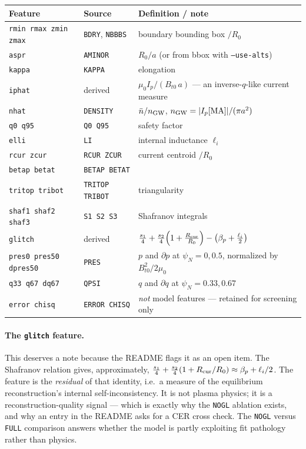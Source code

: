 \documentclass[11pt,a4paper]{article}
\newcommand{\code}[1]{\texttt{\small #1}}
\begin{document}
\begin{longtable}{@{}>{\raggedright\arraybackslash}p{}l>{\raggedright\arraybackslash}p{}@{}}
\toprule
\textbf{Feature} & \textbf{Source} & \textbf{Definition / note} \\
\midrule
\endhead
\code{rmin rmax zmin zmax} & \code{BDRY}, \code{NBBBS} & boundary bounding box $/R_0$ \\
\code{aspr}   & \code{AMINOR}  & $R_0/a$ (or from bbox with \code{--use-alts}) \\
\code{kappa}  & \code{KAPPA}   & elongation \\
\code{iphat}  & derived        & $\mu_0 I_p / (B_{t0}\,a)$ --- an inverse-$q$-like current measure \\
\code{nhat}   & \code{DENSITY} & $\bar n / n_{\rm GW}$, $n_{\rm GW}=|I_p[\mathrm{MA}]|/(\pi a^2)$ \\
\code{q0 q95} & \code{Q0 Q95}  & safety factor \\
\code{elli}   & \code{LI}      & internal inductance $\ell_i$ \\
\code{rcur zcur} & \code{RCUR ZCUR} & current centroid $/R_0$ \\
\code{betap betat} & \code{BETAP BETAT} & \\
\code{tritop tribot} & \code{TRITOP TRIBOT} & triangularity \\
\code{shaf1 shaf2 shaf3} & \code{S1 S2 S3} & Shafranov integrals \\
\code{glitch} & derived & $\tfrac{s_1}{4} + \tfrac{s_2}{4}\!\left(1+\tfrac{R_{\rm cur}}{R_0}\right) - \left(\beta_p + \tfrac{\ell_i}{2}\right)$ \\
\code{pres0 pres50 dpres50} & \code{PRES} & $p$ and $\partial p$ at $\psi_N = 0, 0.5$, normalized by $B_{t0}^2/2\mu_0$ \\
\code{q33 q67 dq67} & \code{QPSI} & $q$ and $\partial q$ at $\psi_N = 0.33, 0.67$ \\
\code{error chisq} & \code{ERROR CHISQ} & \emph{not} model features --- retained for screening only \\
\bottomrule
\end{longtable}

\paragraph{The \code{glitch} feature.} This deserves a note because the README flags it as an open
item. The Shafranov relation gives, approximately,
$\tfrac{s_1}{4} + \tfrac{s_2}{4}(1 + R_{\rm cur}/R_0) \approx \beta_p + \ell_i/2$. The feature is the
\emph{residual} of that identity, i.e.\ a measure of the equilibrium reconstruction's internal
self-inconsistency. It is not plasma physics; it is a reconstruction-quality signal --- which is
exactly why the \code{NOGL} ablation exists, and why an entry in the README asks for a CER cross
check. The \code{NOGL} versus \code{FULL} comparison answers whether the model is partly exploiting
fit pathology rather than physics.
\end{document}
